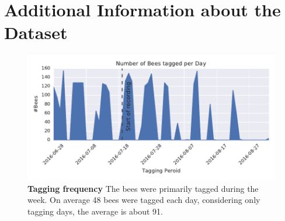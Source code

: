 \chapter{Additional Information about the Dataset}
\label{ch:appendix2:dataset}

\begin{figure}[htb]
	\centering
	\includegraphics[width=1.0\textwidth]{Figures/tagging_period}
	\caption[Tagging frequency]{\textbf{Tagging frequency} The bees were primarily tagged during the week. On average 48 bees were tagged each day, considering only tagging days, the average is about 91.}
	\label{fig:tagging-period}
\end{figure}

